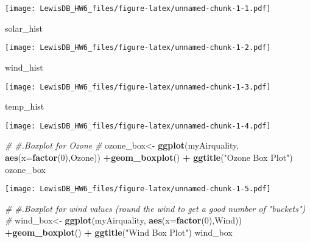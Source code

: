 \documentclass[]{article}
\newenvironment{Shaded}{\begin{snugshade}}{\end{snugshade}}
\newcommand{\KeywordTok}[1]{\textcolor[rgb]{0.13,0.29,0.53}{\textbf{#1}}}
\newcommand{\DataTypeTok}[1]{\textcolor[rgb]{0.13,0.29,0.53}{#1}}
\newcommand{\DecValTok}[1]{\textcolor[rgb]{0.00,0.00,0.81}{#1}}
\newcommand{\StringTok}[1]{\textcolor[rgb]{0.31,0.60,0.02}{#1}}
\newcommand{\CommentTok}[1]{\textcolor[rgb]{0.56,0.35,0.01}{\textit{#1}}}
\newcommand{\OperatorTok}[1]{\textcolor[rgb]{0.81,0.36,0.00}{\textbf{#1}}}
\newcommand{\NormalTok}[1]{#1}
\begin{document}
\texttt{[image: LewisDB\_HW6\_files/figure-latex/unnamed-chunk-1-1.pdf]}

\begin{Shaded}
\begin{Highlighting}[]
\NormalTok{solar_hist}
\end{Highlighting}
\end{Shaded}

\texttt{[image: LewisDB\_HW6\_files/figure-latex/unnamed-chunk-1-2.pdf]}

\begin{Shaded}
\begin{Highlighting}[]
\NormalTok{wind_hist}
\end{Highlighting}
\end{Shaded}

\texttt{[image: LewisDB\_HW6\_files/figure-latex/unnamed-chunk-1-3.pdf]}

\begin{Shaded}
\begin{Highlighting}[]
\NormalTok{temp_hist}
\end{Highlighting}
\end{Shaded}

\texttt{[image: LewisDB\_HW6\_files/figure-latex/unnamed-chunk-1-4.pdf]}

\begin{Shaded}
\begin{Highlighting}[]
\CommentTok{#}
\CommentTok{#.Boxplot for Ozone}
\CommentTok{#}
\NormalTok{ozone_box<-}\StringTok{ }\KeywordTok{ggplot}\NormalTok{(myAirquality, }\KeywordTok{aes}\NormalTok{(}\DataTypeTok{x=}\KeywordTok{factor}\NormalTok{(}\DecValTok{0}\NormalTok{),Ozone)) }\OperatorTok{+}\KeywordTok{geom_boxplot}\NormalTok{() }\OperatorTok{+}\StringTok{ }\KeywordTok{ggtitle}\NormalTok{(}\StringTok{"Ozone Box Plot"}\NormalTok{)}
\NormalTok{ozone_box}
\end{Highlighting}
\end{Shaded}

\texttt{[image: LewisDB\_HW6\_files/figure-latex/unnamed-chunk-1-5.pdf]}

\begin{Shaded}
\begin{Highlighting}[]
\CommentTok{#}
\CommentTok{#.Boxplot for wind values (round the wind to get a good number of "buckets")}
\CommentTok{#}
\NormalTok{wind_box<-}\StringTok{ }\KeywordTok{ggplot}\NormalTok{(myAirquality, }\KeywordTok{aes}\NormalTok{(}\DataTypeTok{x=}\KeywordTok{factor}\NormalTok{(}\DecValTok{0}\NormalTok{),Wind)) }\OperatorTok{+}\KeywordTok{geom_boxplot}\NormalTok{() }\OperatorTok{+}\StringTok{ }\KeywordTok{ggtitle}\NormalTok{(}\StringTok{"Wind Box Plot"}\NormalTok{)}
\NormalTok{wind_box}
\end{Highlighting}
\end{Shaded}
\end{document}
